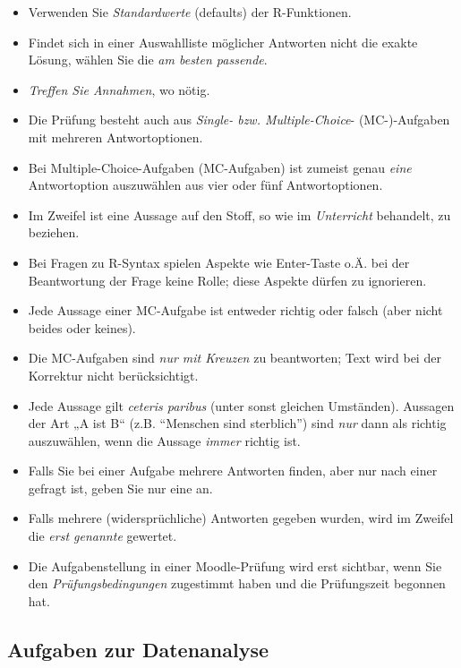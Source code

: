 \documentclass[
  a4paper,
  DIV=11]{scrreprt}
\providecommand{\tightlist}{%
  \setlength{\itemsep}{0pt}\setlength{\parskip}{0pt}}\usepackage{longtable,booktabs,array}
\theoremstyle{definition}
\theoremstyle{remark}
\begin{document}
\begin{itemize}
\tightlist
\item
  Verwenden Sie \emph{Standardwerte} (defaults) der R-Funktionen.
\item
  Findet sich in einer Auswahlliste möglicher Antworten nicht die exakte
  Lösung, wählen Sie die \emph{am besten passende}.
\item
  \emph{Treffen Sie Annahmen}, wo nötig.
\item
  Die Prüfung besteht auch aus \emph{Single- bzw. Multiple-Choice}-
  (MC-)-Aufgaben mit mehreren Antwortoptionen.
\item
  Bei Multiple-Choice-Aufgaben (MC-Aufgaben) ist zumeist genau
  \emph{eine} Antwortoption auszuwählen aus vier oder fünf
  Antwortoptionen.
\item
  Im Zweifel ist eine Aussage auf den Stoff, so wie im \emph{Unterricht}
  behandelt, zu beziehen.
\item
  Bei Fragen zu R-Syntax spielen Aspekte wie Enter-Taste o.Ä. bei der
  Beantwortung der Frage keine Rolle; diese Aspekte dürfen zu
  ignorieren.
\item
  Jede Aussage einer MC-Aufgabe ist entweder richtig oder falsch (aber
  nicht beides oder keines).
\item
  Die MC-Aufgaben sind \emph{nur mit Kreuzen} zu beantworten; Text wird
  bei der Korrektur nicht berücksichtigt.
\item
  Jede Aussage gilt \emph{ceteris paribus} (unter sonst gleichen
  Umständen). Aussagen der Art „A ist B`` (z.B. ``Menschen sind
  sterblich'') sind \emph{nur} dann als richtig auszuwählen, wenn die
  Aussage \emph{immer} richtig ist.
\item
  Falls Sie bei einer Aufgabe mehrere Antworten finden, aber nur nach
  einer gefragt ist, geben Sie nur eine an.
\item
  Falls mehrere (widersprüchliche) Antworten gegeben wurden, wird im
  Zweifel die \emph{erst genannte} gewertet.
\item
  Die Aufgabenstellung in einer Moodle-Prüfung wird erst sichtbar, wenn
  Sie den \emph{Prüfungsbedingungen} zugestimmt haben und die
  Prüfungszeit begonnen hat.
\end{itemize}

\hypertarget{aufgaben-zur-datenanalyse}{%
\subsection{Aufgaben zur Datenanalyse}\label{aufgaben-zur-datenanalyse}}
\end{document}

